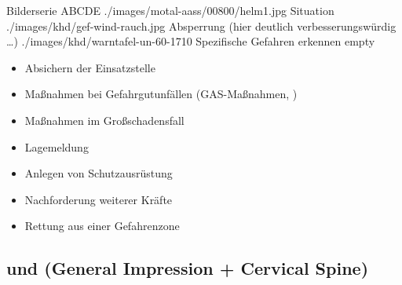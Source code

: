 \begin{PictureSeriesWide}{}{Bilderserie ABCDE}
{./images/motal-aass/00800/helm1.jpg}
{Situation }
{./images/khd/gef-wind-rauch.jpg}
{Absperrung (hier deutlich verbesserungswürdig \ldots) }
{./images/khd/warntafel-un-60-1710}
{Spezifische Gefahren erkennen}
{empty}
{}
\end{PictureSeriesWide}




\clearpage %

{%
\begin{itemize}
  \item Absichern der Einsatzstelle
  \item Maßnahmen bei Gefahrgutunfällen (GAS-Maßnahmen, )
  \item Maßnahmen im Großschadensfall
  \item Lagemeldung
  \item Anlegen von Schutzausrüstung
  \item Nachforderung weiterer Kräfte
  \item Rettung aus einer Gefahrenzone
\end{itemize}
}

\clearpage
\subsection{{}  und
 (General Impression + Cervical Spine)} 

